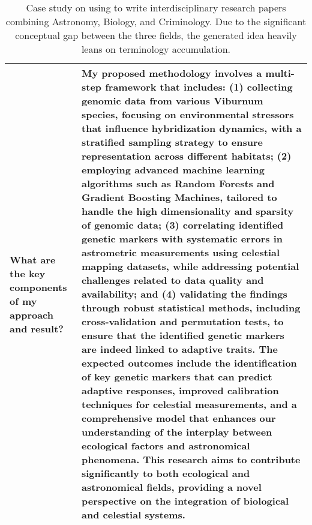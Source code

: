 \begin{table*}[htbp]
\begin{tabular}{p{3.5cm}p{12cm}}
What are the key components of my approach and result? & 
My proposed methodology involves a multi-step framework that includes: (1) collecting genomic data from various Viburnum species, focusing on environmental stressors that influence hybridization dynamics, with a stratified sampling strategy to ensure representation across different habitats; (2) employing advanced machine learning algorithms such as Random Forests and Gradient Boosting Machines, tailored to handle the high dimensionality and sparsity of genomic data; (3) correlating identified genetic markers with systematic errors in astrometric measurements using celestial mapping datasets, while addressing potential challenges related to data quality and availability; and (4) validating the findings through robust statistical methods, including cross-validation and permutation tests, to ensure that the identified genetic markers are indeed linked to adaptive traits. The expected outcomes include the identification of key genetic markers that can predict adaptive responses, improved calibration techniques for celestial measurements, and a comprehensive model that enhances our understanding of the interplay between ecological factors and astronomical phenomena. This research aims to contribute significantly to both ecological and astronomical fields, providing a novel perspective on the integration of biological and celestial systems.\\ 
\bottomrule[1.1pt]
\end{tabular}
\caption{Case study on using \envname to write interdisciplinary research papers combining Astronomy, Biology, and Criminology. Due to the significant conceptual gap between the three fields, the generated idea heavily leans on terminology accumulation.}
\label{tab:Astronomy+Biology+Criminology }
\end{table*}


